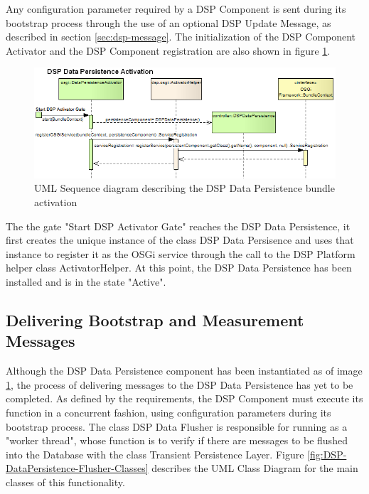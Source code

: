 Any configuration parameter required by a DSP Component is sent during its
bootstrap process through the use of an optional DSP Update Message, as
described in section \ref{sec:dsp-message}. The initialization of the DSP
Component Activator and the DSP Component registration are also shown in
figure \ref{fig:From-OSGi-Framework-to-DSP-Data-PersistenceActivator-Sequence-Diagram}.

\begin{figure}[!b]
  \centering
  \includegraphics[scale=0.5]{../diagrams/From-OSGi-Framework-to-DSP-Data-PersistenceActivator-Sequence-Diagram}
  \caption{UML Sequence diagram describing the DSP Data Persistence bundle activation}
  \label{fig:From-OSGi-Framework-to-DSP-Data-PersistenceActivator-Sequence-Diagram}
\end{figure}

The the gate "Start DSP Activator Gate" reaches the DSP Data Persistence, it
first creates the unique instance of the class DSP Data Persisence and uses
that instance to register it as the OSGi service through the call to the DSP
Platform helper class ActivatorHelper. At this point, the DSP Data Persistence
has been installed and is in the state "Active".

\subsection{Delivering Bootstrap and Measurement Messages}

Although the DSP Data Persistence component has been instantiated as of image
\ref{fig:From-OSGi-Framework-to-DSP-Data-PersistenceActivator-Sequence-Diagram}, 
the process of delivering messages to the DSP Data Persistence has yet to be
completed. As defined by the requirements, the DSP Component must execute its
function in a concurrent fashion, using configuration parameters during its
bootstrap process. The class DSP Data Flusher is responsible for running as a
"worker thread", whose function is to verify if there are messages to be
flushed into the Database with the class Transient Persistence Layer. Figure 
\ref{fig:DSP-DataPersistence-Flusher-Classes} describes the UML Class
Diagram \cite{uml} for the main classes of this functionality.

